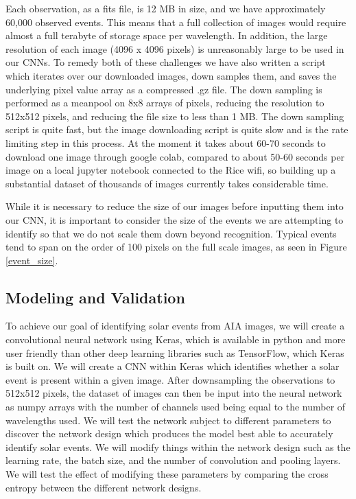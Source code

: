\documentclass[12pt, letterpaper]{article}
\begin{document}
Each observation, as a fits file, is 12 MB in size, and we have approximately 60,000 observed events. This means that a full collection of images would require almost a full terabyte of storage space per wavelength. In addition, the large resolution of each image (4096 x 4096 pixels) is unreasonably large to be used in our CNNs. To remedy both of these challenges we have also written a script which iterates over our downloaded images, down samples them, and saves the underlying pixel value array as a compressed .gz file. The down sampling is performed as a meanpool on 8x8 arrays of pixels, reducing the resolution to 512x512 pixels, and reducing the file size to less than 1 MB. The down sampling script is quite fast, but the image downloading script is quite slow and is the rate limiting step in this process. At the moment it takes about 60-70 seconds to download one image through google colab, compared to about 50-60 seconds per image on a local jupyter notebook connected to the Rice wifi, so building up a substantial dataset of thousands of images currently takes considerable time.

While it is necessary to reduce the size of our images before inputting them into our CNN, it is important to consider the size of the events we are attempting to identify so that we do not scale them down beyond recognition. Typical events tend to span on the order of 100 pixels on the full scale images, as seen in Figure \ref{event_size}.


\subsection*{Modeling and Validation}

To achieve our goal of identifying solar events from AIA images, we will create a convolutional neural network using Keras, which is available in python and more user friendly than other deep learning libraries such as TensorFlow, which Keras is built on. We will create a CNN within Keras which identifies whether a solar event is present within a given image. After downsampling the observations to 512x512 pixels, the dataset of images can then be input into the neural network as numpy arrays with the number of channels used being equal to the number of wavelengths used. We will test the network subject to different parameters to discover the network design which produces the model best able to accurately identify solar events. We will modify things within the network design such as the learning rate, the batch size, and the number of convolution and pooling layers. We will test the effect of modifying these parameters by comparing the cross entropy between the different network designs.
\end{document}
